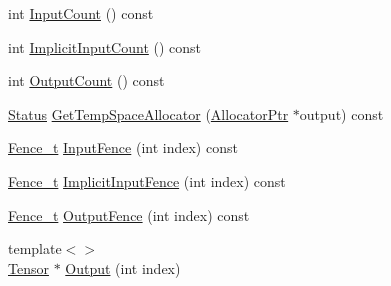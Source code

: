 \begin{DoxyCompactItemize}
\item 
int \mbox{\hyperlink{classonnxruntime_1_1OpKernelContext_a155914a177b5e3bd08f6aa3d110bd7a3}{Input\+Count}} () const
\item 
int \mbox{\hyperlink{classonnxruntime_1_1OpKernelContext_a6abb7a4b5f90e4675ba6113146a63a09}{Implicit\+Input\+Count}} () const
\item 
int \mbox{\hyperlink{classonnxruntime_1_1OpKernelContext_a3761dd6cb3ba88c633e09bce648a5aab}{Output\+Count}} () const
\item 
\mbox{\hyperlink{classonnxruntime_1_1common_1_1Status}{Status}} \mbox{\hyperlink{classonnxruntime_1_1OpKernelContext_af72694f683ed00ea2762638c860149b1}{Get\+Temp\+Space\+Allocator}} (\mbox{\hyperlink{namespaceonnxruntime_a6cdac724c5dcefded3a63f08dae58fda}{Allocator\+Ptr}} $\ast$output) const
\item 
\mbox{\hyperlink{namespaceonnxruntime_a71ef3c4da6339a3625cdf4c4937e4913}{Fence\+\_\+t}} \mbox{\hyperlink{classonnxruntime_1_1OpKernelContext_a248e10d4549d836294cfee933098c71f}{Input\+Fence}} (int index) const
\item 
\mbox{\hyperlink{namespaceonnxruntime_a71ef3c4da6339a3625cdf4c4937e4913}{Fence\+\_\+t}} \mbox{\hyperlink{classonnxruntime_1_1OpKernelContext_a7ff52b09e3b71c94f680bf75917647a9}{Implicit\+Input\+Fence}} (int index) const
\item 
\mbox{\hyperlink{namespaceonnxruntime_a71ef3c4da6339a3625cdf4c4937e4913}{Fence\+\_\+t}} \mbox{\hyperlink{classonnxruntime_1_1OpKernelContext_aa99f644d327b045733e6f5cd000264e1}{Output\+Fence}} (int index) const
\item 
{\footnotesize template$<$$>$ }\\\mbox{\hyperlink{classonnxruntime_1_1Tensor}{Tensor}} $\ast$ \mbox{\hyperlink{classonnxruntime_1_1OpKernelContext_a00b2277826ce34e6adc2b1efd028a6cc}{Output}} (int index)
\end{DoxyCompactItemize}
